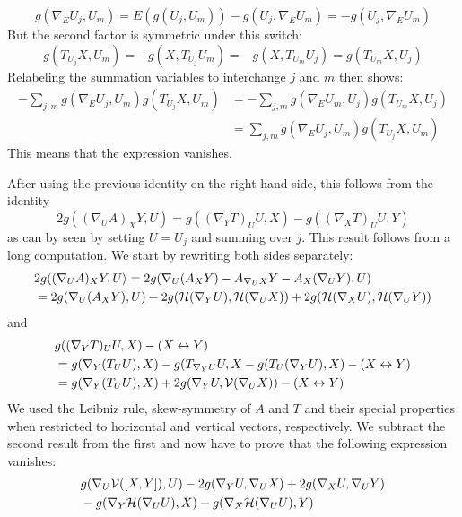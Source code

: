 \begin{myproof}
\begin{numberedlist}
		\begin{equation*}
			g(\nabla_E U_j,U_m)=E(g(U_j,U_m))-g(U_j,\nabla_E U_m)=-g(U_j,\nabla_E U_m)
		\end{equation*}
		But the second factor is symmetric under this switch:
		\begin{equation*}
			g(T_{U_j}X,U_m)=-g(X,T_{U_j}U_m)=-g(X,T_{U_m}U_j)=g(T_{U_m}X,U_j)
		\end{equation*}
		Relabeling the summation variables to interchange $j$ and $m$ then shows: 
		\begin{align*}
			-\sum_{j,m} g(\nabla_E U_j,U_m)g(T_{U_j}X,U_m)
			&=-\sum_{j,m} g(\nabla_E U_m,U_j)g(T_{U_m}X,U_j)\\
			&=\sum_{j,m} g(\nabla_E U_j,U_m)g(T_{U_j}X,U_m)
		\end{align*}
		This means that the expression vanishes.
		\item After using the previous identity on the right hand side, this follows from the identity
		\begin{equation*}
			2g((\nabla_U A)_X Y,U)=
			g((\nabla_Y T)_U U,X)-g((\nabla_X T)_U U,Y)
		\end{equation*}
		as can by seen by setting $U=U_j$ and summing over $j$. This result follows from a long computation. We start by rewriting both sides separately:
		\begin{align*}
			&2g((\nabla_U A)_X Y,U\rangle 
			=2g(\nabla_U(A_X Y)-A_{\nabla_UX}Y-A_X(\nabla_UY),U)\\
			&=2g(\nabla_U (A_X Y),U)-2g(\mathcal{H}(\nabla_YU),\mathcal{H}(\nabla_UX))
			+2g(\mathcal{H}(\nabla_X U),\mathcal{H}(\nabla_U Y))\\
		\end{align*}
		and 
		\begin{align*}
			&g((\nabla_YT)_U U,X)-(X \leftrightarrow Y)\\
			&=g(\nabla_Y(T_U U),X)-g(T_{\nabla_YU}U,X-g(T_U(\nabla_YU),X) -(X\leftrightarrow Y)\\
			&=g(\nabla_Y(T_U U),X)+2 g(\nabla_Y U,\mathcal{V}(\nabla_U X))- (X\leftrightarrow Y)
		\end{align*}
		We used the Leibniz rule, skew-symmetry of $A$ and $T$ and their special properties when restricted to horizontal and vertical vectors, respectively. We subtract the second result from the first and now have to prove that the following expression vanishes:
		\begin{align*}
			&g(\nabla_U\mc V([X,Y]),U)-2g(\nabla_Y U,\nabla_U X)+2g(\nabla_X U,\nabla_U Y)\\
			&-g(\nabla_Y \mc H(\nabla_U U),X)+g(\nabla_X \mc H(\nabla_U U),Y)

\end{align*}
\end{numberedlist}
\end{myproof}
